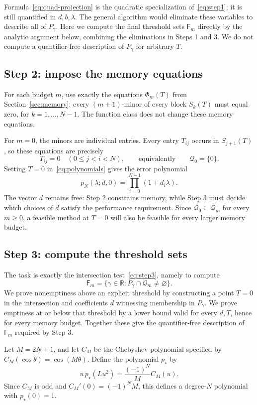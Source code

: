 \documentclass[11pt]{article}
\numberwithin{equation}{section}
\theoremstyle{definition}
\newcommand{\R}{\mathbb R}
\newcommand{\Q}{\mathcal Q}
\begin{document}
Formula~\eqref{eq:quad-projection} is the quadratic specialization of~\eqref{eq:step1}; it is still quantified in $d,b,\lambda$. The general algorithm would eliminate these variables to describe all of $P_\gamma$. Here we compute the final threshold sets $\mathsf F_m$ directly by the analytic argument below, combining the eliminations in Steps 1 and 3. We do not compute a quantifier-free description of $P_\gamma$ for arbitrary $T$.

\subsection{Step 2: impose the memory equations}
For each budget $m$, use exactly the equations $\Phi_m(T)$ from Section~\ref{sec:memory}: every $(m+1)$-minor of every block $S_k(T)$ must equal zero, for $k=1,\ldots,N-1$. The function class does not change these memory equations.

For $m=0$, the minors are individual entries. Every entry $T_{ij}$ occurs in $S_{j+1}(T)$, so these equations are precisely
\[
 T_{ij}=0\quad(0\le j<i<N),\qquad\text{equivalently}\qquad\Q_0=\{0\}.
\]
Setting $T=0$ in~\eqref{eq:polynomials} gives the error polynomial
\begin{equation}
 p_N(\lambda;d,0)=\prod_{i=0}^{N-1}(1+d_i\lambda).
 \label{eq:product}
\end{equation}
The vector $d$ remains free: Step 2 constrains memory, while Step 3 must decide which choices of $d$ satisfy the performance requirement. Since $\Q_0\subseteq\Q_m$ for every $m\ge0$, a feasible method at $T=0$ will also be feasible for every larger memory budget.

\subsection{Step 3: compute the threshold sets}
The task is exactly the intersection test~\eqref{eq:step3}, namely to compute
\[
 \mathsf F_m=\{\gamma\in\R:P_\gamma\cap\Q_m\ne\varnothing\}.
\]
We prove nonemptiness above an explicit threshold by constructing a point $T=0$ in the intersection and coefficients $d$ witnessing membership in $P_\gamma$. We prove emptiness at or below that threshold by a lower bound valid for every $d,T$, hence for every memory budget. Together these give the quantifier-free description of $\mathsf F_m$ required by Step 3.

Let $M=2N+1$, and let $C_M$ be the Chebyshev polynomial specified by
$C_M(\cos\theta)=\cos(M\theta)$. Define the polynomial $p_\star$ by
\begin{equation}
 u\,p_\star(Lu^2)=\frac{(-1)^N}{M}C_M(u).
 \label{eq:Cheb}
\end{equation}
Since $C_M$ is odd and $C_M'(0)=(-1)^NM$, this defines a degree-$N$ polynomial with $p_\star(0)=1$.
\end{document}
